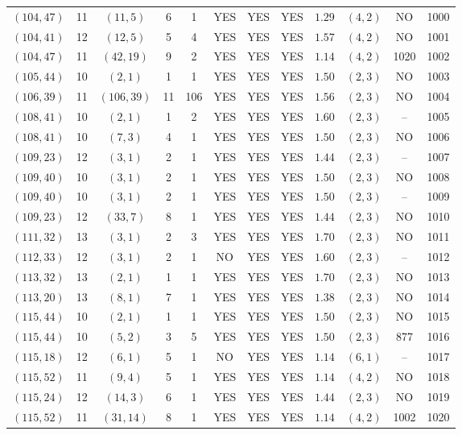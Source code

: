 \begin{longtable}{|c|c|c|c|c|c|c|c|c|c|c|c|}
$(104,47)$ & 11 & $(11,5)$ & 6 & 1 & YES & YES & YES & $1.29$ & $(4,2)$ & NO & 1000\\
$(104,41)$ & 12 & $(12,5)$ & 5 & 4 & YES & YES & YES & $1.57$ & $(4,2)$ & NO & 1001\\
$(104,47)$ & 11 & $(42,19)$ & 9 & 2 & YES & YES & YES & $1.14$ & $(4,2)$ & 1020 & 1002\\
$(105,44)$ & 10 & $(2,1)$ & 1 & 1 & YES & YES & YES & $1.50$ & $(2,3)$ & NO & 1003\\
$(106,39)$ & 11 & $(106,39)$ & 11 & 106 & YES & YES & YES & $1.56$ & $(2,3)$ & NO & 1004\\
$(108,41)$ & 10 & $(2,1)$ & 1 & 2 & YES & YES & YES & $1.60$ & $(2,3)$ & -- & 1005\\
$(108,41)$ & 10 & $(7,3)$ & 4 & 1 & YES & YES & YES & $1.50$ & $(2,3)$ & NO & 1006\\
$(109,23)$ & 12 & $(3,1)$ & 2 & 1 & YES & YES & YES & $1.44$ & $(2,3)$ & -- & 1007\\
$(109,40)$ & 10 & $(3,1)$ & 2 & 1 & YES & YES & YES & $1.50$ & $(2,3)$ & NO & 1008\\
$(109,40)$ & 10 & $(3,1)$ & 2 & 1 & YES & YES & YES & $1.50$ & $(2,3)$ & -- & 1009\\
$(109,23)$ & 12 & $(33,7)$ & 8 & 1 & YES & YES & YES & $1.44$ & $(2,3)$ & NO & 1010\\
$(111,32)$ & 13 & $(3,1)$ & 2 & 3 & YES & YES & YES & $1.70$ & $(2,3)$ & NO & 1011\\
$(112,33)$ & 12 & $(3,1)$ & 2 & 1 & NO & YES & YES & $1.60$ & $(2,3)$ & -- & 1012\\
$(113,32)$ & 13 & $(2,1)$ & 1 & 1 & YES & YES & YES & $1.70$ & $(2,3)$ & NO & 1013\\
$(113,20)$ & 13 & $(8,1)$ & 7 & 1 & YES & YES & YES & $1.38$ & $(2,3)$ & NO & 1014\\
$(115,44)$ & 10 & $(2,1)$ & 1 & 1 & YES & YES & YES & $1.50$ & $(2,3)$ & NO & 1015\\
$(115,44)$ & 10 & $(5,2)$ & 3 & 5 & YES & YES & YES & $1.50$ & $(2,3)$ & 877 & 1016\\
$(115,18)$ & 12 & $(6,1)$ & 5 & 1 & NO & YES & YES & $1.14$ & $(6,1)$ & -- & 1017\\
$(115,52)$ & 11 & $(9,4)$ & 5 & 1 & YES & YES & YES & $1.14$ & $(4,2)$ & NO & 1018\\
$(115,24)$ & 12 & $(14,3)$ & 6 & 1 & YES & YES & YES & $1.44$ & $(2,3)$ & NO & 1019\\
$(115,52)$ & 11 & $(31,14)$ & 8 & 1 & YES & YES & YES & $1.14$ & $(4,2)$ & 1002 & 1020\\

\end{longtable}
